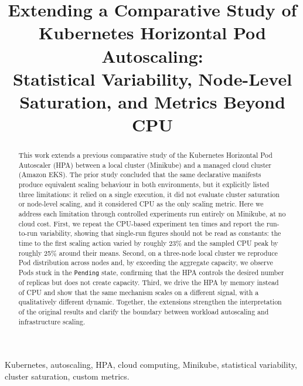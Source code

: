 \documentclass[conference]{IEEEtran}
\begin{document}
\title{Extending a Comparative Study of Kubernetes Horizontal Pod Autoscaling:\\
Statistical Variability, Node-Level Saturation, and Metrics Beyond CPU}

\author{
}

\maketitle

\begin{abstract}
This work extends a previous comparative study of the Kubernetes Horizontal Pod
Autoscaler (HPA) between a local cluster (Minikube) and a managed cloud cluster
(Amazon EKS). The prior study concluded that the same declarative manifests
produce equivalent scaling behaviour in both environments, but it explicitly
listed three limitations: it relied on a single execution, it did not evaluate
cluster saturation or node-level scaling, and it considered CPU as the only
scaling metric. Here we address each limitation through controlled experiments
run entirely on Minikube, at no cloud cost. First, we repeat the CPU-based
experiment ten times and report the run-to-run variability, showing that
single-run figures should not be read as constants: the time to the first
scaling action varied by roughly 23\% and the sampled CPU peak by roughly 25\%
around their means. Second, on a three-node local cluster we reproduce Pod
distribution across nodes and, by exceeding the aggregate capacity, we observe
Pods stuck in the \texttt{Pending} state, confirming that the HPA controls the
desired number of replicas but does not create capacity. Third, we drive the HPA
by memory instead of CPU and show that the same mechanism scales on a different
signal, with a qualitatively different dynamic. Together, the extensions
strengthen the interpretation of the original results and clarify the boundary
between workload autoscaling and infrastructure scaling.
\end{abstract}

\begin{IEEEkeywords}
Kubernetes, autoscaling, HPA, cloud computing, Minikube, statistical
variability, cluster saturation, custom metrics.
\end{IEEEkeywords}
\end{document}
